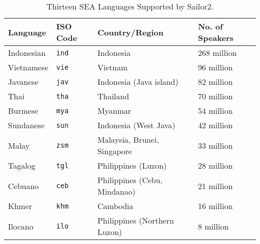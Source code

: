 \begin{table}[ht]
\centering
\small
\renewcommand{\arraystretch}{1.3} %
\setlength{\tabcolsep}{8pt} %
\caption{Thirteen SEA Languages Supported by Sailor2.}
\label{tab:languages_family}
\begin{tabular}{p{2cm}p{1.6cm}p{4.8cm}p{2.5cm}}
\toprule
\textbf{Language} & \textbf{ISO Code} & \textbf{Country/Region}            & \textbf{No. of Speakers}                  \\ \midrule
Indonesian        & \texttt{ind}       & Indonesia                          & 268 million                                             \\ 
Vietnamese        & \texttt{vie}       & Vietnam                            & 96 million                                             \\ 
Javanese          & \texttt{jav}       & Indonesia (Java island)            & 82 million                                             \\ 
Thai              & \texttt{tha}       & Thailand                           & 70 million                                             \\ 
Burmese           & \texttt{mya}       & Myanmar                            & 54 million                                             \\ 
Sundanese         & \texttt{sun}       & Indonesia (West Java)              & 42 million                                             \\ 
Malay             & \texttt{zsm}       & Malaysia, Brunei, Singapore        & 33 million                                           \\ 
Tagalog           & \texttt{tgl}       & Philippines (Luzon)               & 28 million                                             \\ 
Cebuano           & \texttt{ceb}      & Philippines (Cebu, Mindanao)       & 21 million                                             \\
Khmer             & \texttt{khm}       & Cambodia                           & 16 million                                             \\ 
Ilocano           & \texttt{ilo}      & Philippines (Northern Luzon)       & 8 million                                              \\ 

\end{tabular}
\end{table}
